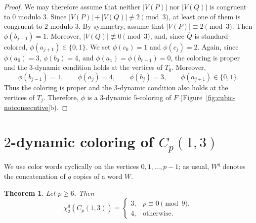 \documentclass[10pt,a4paper]{article}
\newtheorem{theorem}             {Theorem}
\theoremstyle{case}
\numberwithin{subcase}{case}
\begin{document}
\begin{proof}
We may therefore assume that neither $|V(P)|$ nor $|V(Q)|$ is
congruent to $0$ modulo $3$. Since
$|V(P)|+|V(Q)|\not\equiv2\pmod3$, at least one of them is congruent
to $2$ modulo $3$. By symmetry, assume that
$|V(P)|\equiv2\pmod3$.
Then $\phi(b_{j-1})=1$. Moreover, $|V(Q)|\not\equiv0\pmod3$, and,
since $\overline{Q}$ is standard-colored,
$\phi(a_{j+1})\in\{0,1\}$.
We set $\phi(c_0)=1$ and $\phi(c_j)=2$. Again, since
$\phi(a_0)=3$, $\phi(b_0)=4$, and
$\phi(a_1)=\phi(b_{r-1})=0$, the coloring is proper and the
$3$-dynamic condition holds at the vertices of $T_0$.
Moreover,
\[
\phi(b_{j-1})=1,\qquad
\phi(a_j)=4,\qquad
\phi(b_j)=3,\qquad
\phi(a_{j+1})\in\{0,1\}.
\]
Thus the coloring is proper and the $3$-dynamic condition also holds
at the vertices of $T_j$. Therefore, $\phi$ is a $3$-dynamic
$5$-coloring of $F$ (Figure~\ref{fig:cubic-notconsecutive}b).
\end{proof}


%
\section{$2$-dynamic coloring of $C_p(1,3)$}

We use color words cyclically on the vertices
$0,1,\ldots,p-1$; as usual, $W^q$ denotes the concatenation of
$q$ copies of a word $W$.

\begin{theorem}\label{thm:circulant-r2}
Let $p\ge6$. Then
\[
\chi_2^d(C_p(1,3))=
\begin{cases}
3, & p\equiv0\pmod9,\\
4, & \text{otherwise}.
\end{cases}
\]
\end{theorem}
\end{document}
